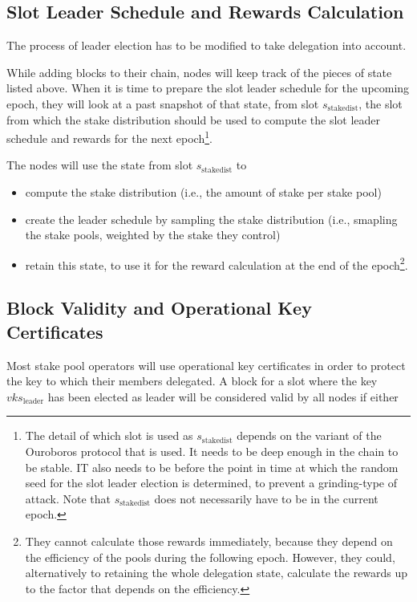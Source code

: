 \documentclass[11pt,a4paper]{article}
\begin{document}
\subsection{Slot Leader Schedule and Rewards Calculation}
\label{slot-leader-schedule}

The process of leader election has to be modified to take delegation
into account.

While adding blocks to their chain, nodes will keep track of the
pieces of state listed above. When it is time to prepare the slot
leader schedule for the upcoming epoch, they will look at a past
snapshot of that state, from slot \(s_\text{stakedist}\), the slot
from which the stake distribution should be used to compute the slot
leader schedule and rewards for the next epoch\footnote{The detail of
  which slot is used as \(s_\text{stakedist}\) depends on the variant
  of the Ouroboros protocol that is used. It needs to be deep enough
  in the chain to be stable. IT also needs to be before the point in
  time at which the random seed for the slot leader election is
  determined, to prevent a grinding-type of attack. Note that
  \(s_\text{stakedist}\) does not necessarily have to be in the
  current epoch.}.

The nodes will use the state from slot \(s_\text{stakedist}\) to
\begin{itemize}
\item compute the stake distribution (i.e., the amount of stake per
  stake pool)
\item create the leader schedule by sampling the stake distribution
  (i.e., smapling the stake pools, weighted by the stake they control)
\item retain this state, to use it for the reward calculation at the
  end of the epoch\footnote{They cannot calculate those rewards
    immediately, because they depend on the efficiency of the pools
    during the following epoch. However, they could, alternatively to
    retaining the whole delegation state, calculate the rewards up to
    the factor that depends on the efficiency.}.
\end{itemize}

\subsection{Block Validity and Operational Key Certificates}
\label{block-validity-and-operational-key-certificates}

Most stake pool operators will use operational key certificates in order to
protect the key to which their members delegated. A block for a slot
where the key \(vks_\text{leader}\) has been elected as leader will be
considered valid by all nodes if either
\end{document}
